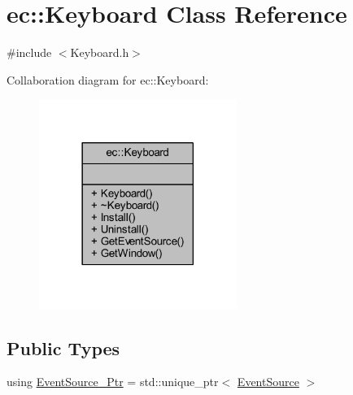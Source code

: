 \hypertarget{classec_1_1_keyboard}{}\section{ec\+:\+:Keyboard Class Reference}
\label{classec_1_1_keyboard}


{\ttfamily \#include $<$Keyboard.\+h$>$}



Collaboration diagram for ec\+:\+:Keyboard\+:
\nopagebreak
\begin{figure}[H]
\begin{center}
\leavevmode
\includegraphics[width=182pt]{classec_1_1_keyboard__coll__graph}
\end{center}
\end{figure}
\subsection*{Public Types}
\begin{DoxyCompactItemize}
\item 
using \mbox{\hyperlink{classec_1_1_keyboard_a9d797ac5b4d42f3b586091bcc14e6343}{Event\+Source\+\_\+\+Ptr}} = std\+::unique\+\_\+ptr$<$ \mbox{\hyperlink{classec_1_1_event_source}{Event\+Source}} $>$
\end{DoxyCompactItemize}
